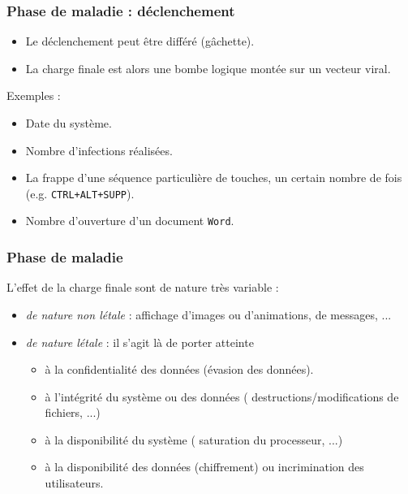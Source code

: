 \documentclass{beamer}
\newcommand{\enlight}[1]{\textit{\color{blue}#1}}
\begin{document}
\begin{frame}
  \frametitle{Phase de maladie : déclenchement}
  \begin{itemize}
\item Le déclenchement peut être différé (gâchette).

\item  La charge finale est alors une bombe logique montée sur un vecteur viral.
  \end{itemize}
  \medskip
  
{\color{blue} Exemples :}


\begin{itemize}
\item Date du système.
\item Nombre d'infections réalisées.
\item La frappe d'une séquence particulière de touches, un certain nombre de fois (e.g. \texttt{CTRL+ALT+SUPP}).
\item Nombre d'ouverture d'un document \texttt{Word}.
\end{itemize}
\end{frame}





\begin{frame}
\frametitle{Phase de maladie}
L'effet de la charge finale sont de nature très variable :
\begin{itemize}
\item \enlight{de nature non létale} : affichage d'images ou d'animations, de messages, ... %
\item \enlight{de nature létale } : il s'agit là de porter atteinte
\begin{itemize}
\item  à la confidentialité des données (évasion des données).
  \smallskip
  
\item  à l'intégrité du système ou des données ( destructions/modifications de fichiers, ...) %
  \smallskip
  
  \item à la disponibilité du système ( saturation du processeur,  ...)
    \smallskip
    
  \item à la disponibilité des données (chiffrement)  ou incrimination des utilisateurs.%
\end{itemize}
\end{itemize}
\end{frame}
\end{document}
